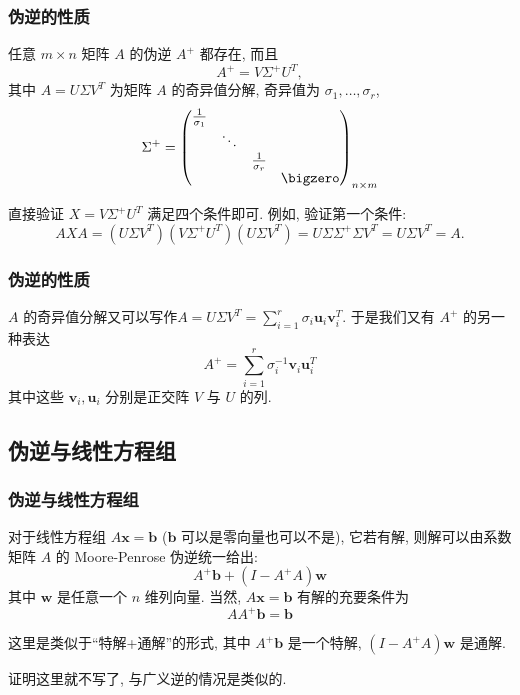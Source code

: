 \begin{frame}
\frametitle{伪逆的性质}

\begin{prop}[伪逆的存在性与唯一性]
任意 $m\times n$ 矩阵 $A$ 的伪逆 $A^+$ 都存在, 而且
\[A^+ = V\Sigma^+U^T,\]
其中 $A = U\Sigma V^T$ 为矩阵 $A$ 的奇异值分解, 奇异值为 $\sigma_1, \ldots, \sigma_r$,
\[\Sigma^+ = \begin{pmatrix}
\frac{1}{\sigma_1} & & & \\ & \ddots & & \\ & & \frac{1}{\sigma_r} & \\ & & & \bigzero \end{pmatrix}_{n\times m}\]
\end{prop}

\pause
\vspace{1em}

\startproof[bg=yellow, fg=red]
直接验证 $X = V\Sigma^+U^T$ 满足四个条件即可. 例如, 验证第一个条件:
\[
AXA = (U\Sigma V^T)(V\Sigma^+U^T)(U\Sigma V^T) = U\Sigma\Sigma^+\Sigma V^T = U\Sigma V^T = A.
\]

\end{frame}


\begin{frame}
\frametitle{伪逆的性质}

\begin{remark}[伪逆的另一种表达]
$A$ 的奇异值分解又可以写作\(\displaystyle A = U\Sigma V^T = \sum\limits_{i=1}^r \sigma_i \mathbf{u}_i \mathbf{v}_i^T \). 于是我们又有 $A^+$ 的另一种表达
\[A^+ = \sum\limits_{i=1}^r \sigma_i^{-1} \mathbf{v}_i \mathbf{u}_i^T\]
其中这些 $\mathbf{v}_i, \mathbf{u}_i$ 分别是正交阵 $V$ 与 $U$ 的列.
\end{remark}

\end{frame}


\subsection{伪逆与线性方程组}


\begin{frame}
\frametitle{伪逆与线性方程组}

\begin{prop}[伪逆与线性方程组解的关系]
对于线性方程组 $A\mathbf{x} = \mathbf{b}$ ($\mathbf{b}$ 可以是零向量也可以不是), 它若有解, 则解可以由系数矩阵 $A$ 的 Moore-Penrose 伪逆统一给出:
\[A^+\mathbf{b} + (I - A^+A)\mathbf{w}\]
其中 $\mathbf{w}$ 是任意一个 $n$ 维列向量. 当然, $A\mathbf{x} = \mathbf{b}$ 有解的充要条件为
\[AA^+\mathbf{b} = \mathbf{b}\]
\end{prop}
这里是类似于``特解+通解''的形式, 其中 $A^+\mathbf{b}$ 是一个特解, $(I - A^+A)\mathbf{w}$ 是通解.

\pause
\vspace{1em}

证明这里就不写了, 与广义逆的情况是类似的.

\end{frame}

